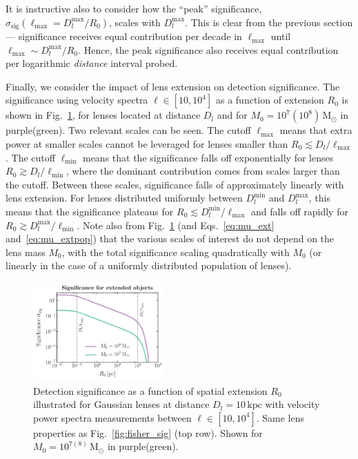 \documentclass[twocolumn]{aastex63}
\begin{document}
It is instructive also to consider how the ``peak'' significance, $\sigma_\mathrm{sig}(\ell_\mathrm{max} = D_l^\mathrm{max}/R_0)$, scales with $D_l^\mathrm{max}$. This is clear from the previous section --- significance receives equal contribution per decade in $\ell_\mathrm{max}$ until $\ell_\mathrm{max} \sim D_l^\mathrm{max}/R_0$. Hence, the peak significance also receives equal contribution per logarithmic \emph{distance} interval probed.

Finally, we consider the impact of lens extension on detection significance. The significance using velocity spectra $\ell \in [10, 10^4]$ as a function of extension $R_0$ is shown in Fig.~\ref{fig:sig_R0}, for lenses located at distance $D_l$ and for $M_0 = 10^{7}(10^{8})\,\mathrm{M}_\odot$ in purple(green). Two relevant scales can be seen. The cutoff $\ell_\mathrm{max}$ means that extra power at smaller scales cannot be leveraged for lenses smaller than $R_0 \lesssim D_l/\ell_\mathrm{max}$. The cutoff $\ell_\mathrm{min}$ means that the significance falls off exponentially for lenses $R_0 \gtrsim D_l/\ell_\mathrm{min}$, where the dominant contribution comes from scales larger than the cutoff. Between these scales, significance falls of approximately linearly with lens extension. For lenses distributed uniformly between $D_l^\mathrm{min}$ and $D_l^\mathrm{max}$, this means that the significance plateaus for $R_0 \lesssim D_l^\mathrm{min}/\ell_\mathrm{max}$ and falls off rapidly for $R_0 \gtrsim D_l^\mathrm{max}/\ell_\mathrm{min}$. Note also from Fig.~\ref{fig:sig_R0} (and Eqs.~\ref{eq:mu_ext} and~\ref{eq:mu_extpop}) that the various scales of interest do not depend on the lens mass $M_0$, with the total significance scaling quadratically with $M_0$ (or linearly in the case of a uniformly distributed population of lenses).

\begin{figure}[htbp]
  \centering
  \includegraphics[width=0.45\textwidth]{plots/sig_R0}
  \caption{Detection significance as a function of spatial extension $R_0$ illustrated for Gaussian lenses at distance $D_l=10\,\mathrm{kpc}$ with velocity power spectra measurements between $\ell \in [10, 10^4]$. Same lens properties as Fig.~\ref{fig:fisher_sig} (top row). Shown for $M_0 = 10^{7(8)}\,\mathrm{M}_\odot$ in purple(green).} 
  \label{fig:sig_R0}
\end{figure}{}
\end{document}
